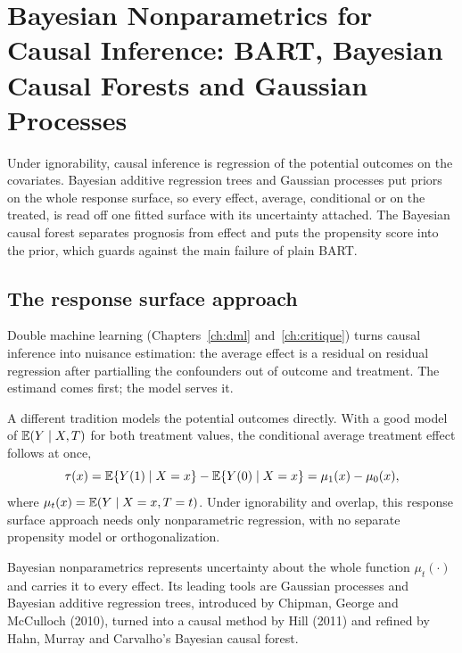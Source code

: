 \chapter[Bayesian Nonparametrics for Causal Inference]{Bayesian Nonparametrics for Causal Inference: BART, Bayesian Causal Forests and Gaussian Processes}\label{ch:bart}

\begin{tcolorbox}[colback=gray!6,colframe=gray!50,title=In brief,fonttitle=\normalfont\itshape,coltitle=black,colbacktitle=gray!15,boxrule=0.4pt,arc=1pt]
Under ignorability, causal inference is regression of the potential outcomes on the covariates. Bayesian additive regression trees and Gaussian processes put priors on the whole response surface, so every effect, average, conditional or on the treated, is read off one fitted surface with its uncertainty attached. The Bayesian causal forest separates prognosis from effect and puts the propensity score into the prior, which guards against the main failure of plain BART.
\end{tcolorbox}

\section{The response surface approach}

Double machine learning (Chapters~\ref{ch:dml} and~\ref{ch:critique}) turns causal inference into nuisance estimation: the average effect is a residual on residual regression after partialling the confounders out of outcome and treatment. The estimand comes first; the model serves it.

A different tradition models the potential outcomes directly. With a good model of $\mathbb{E}(Y \mid X, T)$ for both treatment values, the conditional average treatment effect follows at once,
\begin{equation}
\tau(x) = \mathbb{E}\{Y(1) \mid X = x\} - \mathbb{E}\{Y(0) \mid X = x\} = \mu_1(x) - \mu_0(x),
\label{eq:bart:cate}
\end{equation}
where $\mu_t(x) = \mathbb{E}(Y \mid X = x, T = t)$. Under ignorability and overlap, this response surface approach needs only nonparametric regression, with no separate propensity model or orthogonalization.

Bayesian nonparametrics represents uncertainty about the whole function $\mu_t(\cdot)$ and carries it to every effect. Its leading tools are Gaussian processes and Bayesian additive regression trees, introduced by Chipman, George and McCulloch (2010), turned into a causal method by Hill (2011) and refined by Hahn, Murray and Carvalho's Bayesian causal forest.

